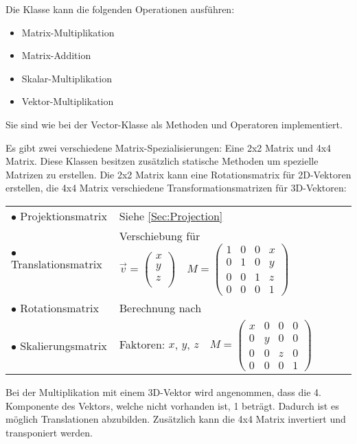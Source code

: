  Die Klasse kann die folgenden Operationen ausführen:
\begin{itemize}
	\item Matrix-Multiplikation
	\item Matrix-Addition
	\item Skalar-Multiplikation
	\item Vektor-Multiplikation
\end{itemize}
Sie sind wie bei der Vector-Klasse als Methoden und Operatoren implementiert.

Es gibt zwei verschiedene Matrix-Spezialisierungen: Eine 2x2 Matrix und 4x4 Matrix.
Diese Klassen besitzen zusätzlich statische Methoden um spezielle Matrizen zu erstellen. Die 2x2 Matrix kann eine Rotationsmatrix für 2D-Vektoren erstellen, die 4x4 Matrix verschiedene Transformationsmatrizen für 3D-Vektoren:
	\begin{longtable}[l]{ll}
		$\bullet$ Projektionsmatrix & Siehe \cref{Sec:Projection}\\
		$\bullet$ Translationsmatrix & Verschiebung für $\overrightarrow{v} = \begin{pmatrix}
		x \\ y \\ z \\\end{pmatrix} \quad M = \begin{pmatrix}
		1 & 0 & 0 & x \\
		0 & 1 & 0 & y \\
		0 & 0 & 1 & z \\
		0 & 0 & 0 & 1
		\end{pmatrix}$\\
		$\bullet$ Rotationsmatrix & Berechnung nach \cite{WikiRotation}\\
		$\bullet$ Skalierungsmatrix & Faktoren: $x$, $y$, $z \quad M = \begin{pmatrix}
		x & 0 & 0 & 0 \\
		0 & y & 0 & 0 \\
		0 & 0 & z & 0 \\
		0 & 0 & 0 & 1
		\end{pmatrix}$\\
	\end{longtable}

 Bei der Multiplikation mit einem 3D-Vektor wird angenommen, dass die 4. Komponente des Vektors, welche nicht vorhanden ist, 1 beträgt. Dadurch ist es möglich Translationen abzubilden. Zusätzlich kann die 4x4 Matrix invertiert und transponiert werden.  

